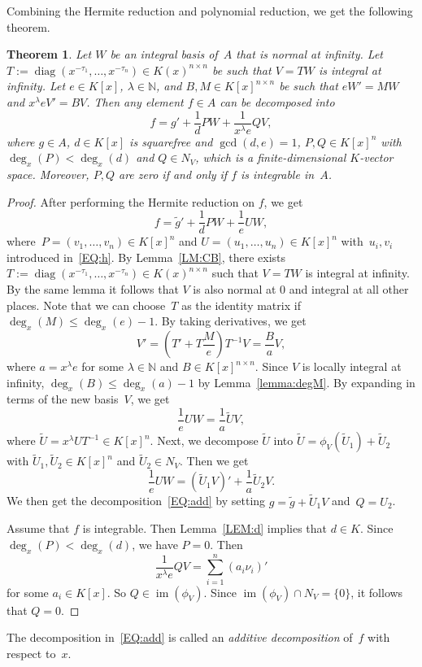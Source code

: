 \documentclass{sig-alternate}
\newtheorem{theorem}{Theorem}
\newcommand{\bN}{ {\mathbb N}}
\def\im{\operatorname{im}}
\def\diag{\operatorname{diag}}
\begin{document}
Combining the Hermite reduction and polynomial reduction, we get the following theorem.
\begin{theorem}\label{THM:polyred}
Let $W$ be an integral basis of~$A$ that is normal at infinity.
Let $T := \diag(x^{-\tau_1}, \ldots, x^{-\tau_n}) \in K(x)^{n\times n}$
be such that $V = TW$ is integral at infinity.
Let $e\in K[x]$, $\lambda \in \bN$, and $B, M \in K[x]^{n \times n} $ be such that
$eW' = MW$ and $x^\lambda eV' = BV$.
Then any element $f\in A$ can be decomposed into
\begin{equation}\label{EQ:add}
f = g' + \frac{1}{d} PW + \frac{1}{x^\lambda e} QV,
\end{equation}
where $g\in A$, $d\in K[x]$ is squarefree and $\gcd(d, e)=1$, $P, Q\in K[x]^n$ with $\deg_x(P) < \deg_x(d)$ and $Q\in N_V$, which is
a finite-dimensional $K$-vector space. Moreover, $P, Q$ are zero if and only if $f$ is integrable in~$A$.
\end{theorem}
\begin{proof}
After performing the Hermite reduction on $f$, we get
\[f = \tilde{g}' + \frac{1}{d} PW + \frac{1}{e} UW,\]
where~$P = (v_1, \ldots, v_n)\in K[x]^n$ and $U = (u_1, \ldots, u_n)\in K[x]^n$
with~$u_i, v_i$ introduced in~\eqref{EQ:h}. By Lemma~\ref{LM:CB}, there exists
$T := \diag(x^{-\tau_1}, \ldots, x^{-\tau_n}) \in K(x)^{n\times n}$
such that $V = TW$ is integral at infinity. By the same lemma it follows
that $V$ is also normal at $0$ and integral at all other places. Note that we can
choose~$T$ as the identity matrix if~$\deg_x(M)\leq \deg_x(e)-1$.
By taking derivatives, we get
\[V' = \left(T' + T\frac{M}{e}\right)T^{-1}V = \frac{B}{a}V, \]
where $a=x^\lambda e$ for some $\lambda\in \bN$ and $B\in K[x]^{n\times n}$. Since $V$ is locally integral
at infinity, $\deg_x(B) \leq \deg_x(a)-1$ by Lemma~\ref{lemma:degM}.
By expanding in terms of the new basis~$V$, we get
\[\frac{1}{e} UW = \frac{1}{a} \tilde{U}V, \]
where $\tilde{U} = x^\lambda U T^{-1} \in K[x]^n$. Next, we decompose $\tilde{U}$ into
$\tilde{U} = \phi_{V}(\tilde{U}_1) + \tilde{U}_2$ with $\tilde{U}_1, \tilde{U}_2\in K[x]^n$ and
$\tilde{U}_2\in N_V$. Then we get
\[\frac{1}{e} UW = (\tilde U_1 V)' + \frac{1}{a} \tilde U_2 V. \]
We then get the decomposition~\eqref{EQ:add} by setting
$g = \tilde g + \tilde U_1 V$ and~$Q = U_2$.

Assume that $f$ is integrable. Then Lemma~\ref{LEM:d} implies that $d\in K$.
Since $\deg_x(P) < \deg_x(d)$, we have $P=0$. Then
\[\frac{1}{x^\lambda e} QV = \sum_{i=1}^n (a_i \nu_i)'\]
for some $a_i\in K[x]$. So $Q \in \im(\phi_V)$.
Since $\im(\phi_V) \cap N_V = \{0\}$, it follows that $Q=0$.
\end{proof}
The decomposition in~\eqref{EQ:add} is called an \emph{additive decomposition} of~$f$ with respect to~$x$.
\end{document}
